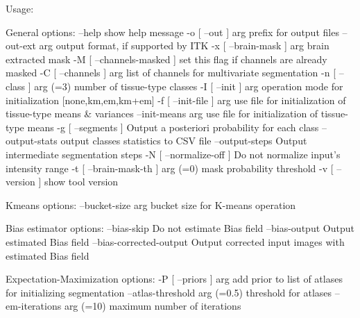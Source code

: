 Usage:

General options:
  --help                          show help message
  -o [ --out ] arg                prefix for output files
  --out-ext arg                   output format, if supported by ITK
  -x [ --brain-mask ] arg         brain extracted mask
  -M [ --channels-masked ]        set this flag if channels are already masked
  -C [ --channels ] arg           list of channels for multivariate 
                                  segmentation
  -n [ --class ] arg (=3)         number of tissue-type classes
  -I [ --init ] arg               operation mode for initialization 
                                  [none,km,em,km+em]
  -f [ --init-file ] arg          use file for initialization of tissue-type 
                                  means & variances
  --init-means arg                use file for initialization of tissue-type 
                                  means
  -g [ --segments ]               Output a posteriori probability for each 
                                  class
  --output-stats                  output classes statistics to CSV file
  --output-steps                  Output intermediate segmentation steps
  -N [ --normalize-off ]          Do not normalize input's intensity range
  -t [ --brain-mask-th ] arg (=0) mask probability threshold
  -v [ --version ]                show tool version

Kmeans options:
  --bucket-size arg     bucket size for K-means operation

Bias estimator options:
  --bias-skip              Do not estimate Bias field
  --bias-output            Output estimated Bias field
  --bias-corrected-output  Output corrected input images with estimated Bias 
                           field

Expectation-Maximization options:
  -P [ --priors ] arg          add prior to list of atlases for initializing 
                               segmentation
  --atlas-threshold arg (=0.5) threshold for atlases
  --em-iterations arg (=10)    maximum number of iterations

